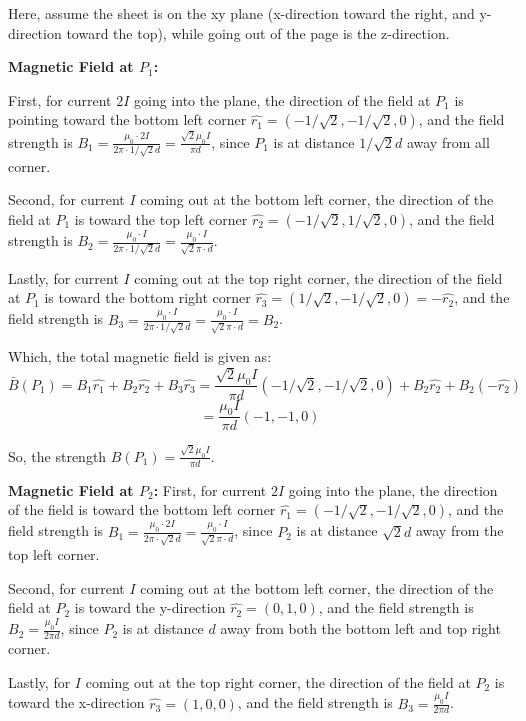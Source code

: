 \documentclass{article}
\begin{document}
Here, assume the sheet is on the xy plane (x-direction toward the right, and y-direction toward the top), while going out of the page is the z-direction.

\hfill

\textbf{Magnetic Field at $P_1$:}

First, for current $2I$ going into the plane, the direction of the field at $P_1$ is pointing toward the bottom left corner $\hat{r_1}=(-1/\sqrt{2},-1/\sqrt{2},0)$,
and the field strength is $B_1 = \frac{\mu_0\cdot 2I}{2\pi \cdot 1/\sqrt{2}d} = \frac{\sqrt{2}\mu_0 I}{\pi d}$, since $P_1$ is at distance $1/\sqrt{2}d$ away from all corner.

Second, for current $I$ coming out at the bottom left corner, the direction of the field at $P_1$ is toward the top left corner $\hat{r_2}=(-1/\sqrt{2},1/\sqrt{2},0)$,
and the field strength is $B_2 = \frac{\mu_0\cdot I}{2\pi \cdot 1/\sqrt{2}d} = \frac{\mu_0\cdot I}{\sqrt{2}\pi \cdot d}$.

Lastly, for current $I$ coming out at the top right corner, the direction of the field at $P_1$ is toward the bottom right corner $\hat{r_3}=(1/\sqrt{2},-1/\sqrt{2},0) = -\hat{r_2}$,
and the field strength is $B_3 = \frac{\mu_0\cdot I}{2\pi \cdot 1/\sqrt{2}d} = \frac{\mu_0\cdot I}{\sqrt{2}\pi \cdot d} = B_2$.

\hfill

Which, the total magnetic field is given as:
$$\bar{B}(P_1)=B_1\hat{r_1}+B_2\hat{r_2}+B_3\hat{r_3} = \frac{\sqrt{2}\mu_0 I}{\pi d}(-1/\sqrt{2},-1/\sqrt{2},0) + B_2\hat{r_2}+B_2(-\hat{r_2})$$
$$ = \frac{\mu_0 I}{\pi d}(-1,-1,0)$$

So, the strength $B(P_1) = \frac{\sqrt{2}\mu_0 I}{\pi d}$.

\hfill

\textbf{Magnetic Field at $P_2$:}
First, for current $2I$ going into the plane, the direction of the field is toward the bottom left corner $\hat{r_1}=(-1/\sqrt{2},-1/\sqrt{2},0)$,
and the field strength is $B_1 = \frac{\mu_0 \cdot 2I}{2\pi \cdot \sqrt{2}d} = \frac{\mu_0 \cdot I}{\sqrt{2}\pi \cdot d}$, since $P_2$ is at distance $\sqrt{2}d$ away from the top left corner.

Second, for current $I$ coming out at the bottom left corner, the direction of the field at $P_2$ is toward the y-direction $\hat{r_2}=(0,1,0)$,
and the field strength is $B_2 = \frac{\mu_0 I}{2\pi d}$, since $P_2$ is at distance $d$ away from both the bottom left and top right corner.

Lastly, for $I$ coming out at the top right corner, the direction of the field at $P_2$ is toward the x-direction $\hat{r_3}=(1,0,0)$,
and the field strength is $B_3 = \frac{\mu_0 I}{2\pi d}$.
\end{document}
